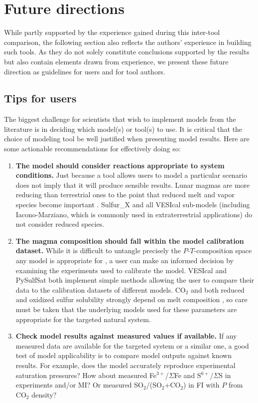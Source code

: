 \documentclass[draft, english]{volcanica-template}
\begin{document}
\section{Future directions}
\label{sec:futuremodel} 

While partly supported by the experience gained during this inter-tool comparison, the following section also reflects the authors' experience in building such tools. As they do not solely constitute conclusions supported by the results but also contain elements drawn from experience, we present these future direction as guidelines for users and for tool authors. 

\subsection{Tips for users}
The biggest challenge for scientists that wish to implement models from the literature is in deciding which model(s) or tool(s) to use. It is critical that the choice of modeling tool be well justified when presenting model results. Here are some actionable recommendations for effectively doing so:
\begin{enumerate}
    \item \textbf{The model should consider reactions appropriate to system conditions.} Just because a tool allows users to model a particular scenario does not imply that it will produce sensible results. Lunar magmas are more reducing than terrestrial ones to the point that reduced melt and vapor species become important \parencite{newcombe2017solubility,scaillet2004role}. Sulfur\_X and all VESIcal sub-models (including Iacono-Marziano, which is commonly used in extraterrestrial applications) do not consider reduced species.
    \item \textbf{The magma composition should fall within the model calibration dataset.} While it is difficult to untangle precisely the $P$-$T$-composition space any model is appropriate for \parencite{Iacovino2021}, a user can make an informed decision by examining the experiments used to calibrate the model. VESIcal and PySulfSat both implement simple methods allowing the user to compare their data to the calibration datasets of different models. CO$_2$ and both reduced and oxidized sulfur solubility strongly depend on melt composition \parencite{o2002sulfide,GhiorsoGualda2015,Oneill2022}, so care must be taken that the underlying models used for these parameters are appropriate for the targeted natural system.
    \item \textbf{Check model results against measured values if available.} If any measured data are available for the targeted system or a similar one, a good test of model applicability is to compare model outputs against known results. For example, does the model accurately reproduce experimental saturation pressures? How about measured Fe$^{3+}$/$\Sigma$Fe and S$^{6+}$/$\Sigma$S in experiments and/or MI? Or measured SO$_2$/(SO$_2$+CO$_2$) in FI with $P$ from CO$_2$ density?
\end{enumerate}
\end{document}
